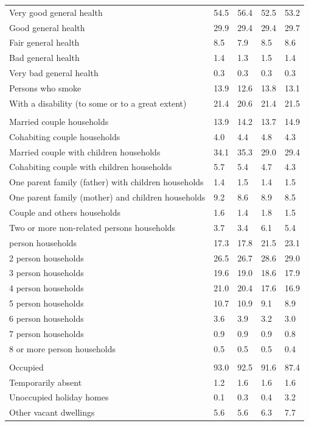 \documentclass{article}
\begin{document}
\begin{table}[h]
\begin{tabular}{KTTTT}
    \hline
Very good general health & 54.5& 56.4&52.5& 53.2\\
Good general health & 29.9& 29.4& 29.4& 29.7\\
Fair general health & 8.5& 7.9&8.5& 8.6\\
Bad general health & 1.4& 1.3&1.5& 1.4\\
Very bad general health & 0.3& 0.3&0.3& 0.3\\
    \hline
Persons who smoke & 13.9& 12.6&13.8& 13.1\\
    \hline
With a disability (to some or to a great extent) & 21.4& 20.6&21.4& 21.5\\
\hline
    \\ 
    \hline
Married couple households & 13.9& 14.2& 13.7& 14.9\\
Cohabiting couple households & 4.0& 4.4& 4.8& 4.3\\
Married couple with children households & 34.1& 35.3& 29.0& 29.4\\
Cohabiting couple with children households & 5.7& 5.4& 4.7& 4.3\\
One parent family (father) with  children households & 1.4& 1.5& 1.4& 1.5\\
One parent family (mother) and children households & 9.2& 8.6& 8.9& 8.5\\
Couple and others households  & 1.6& 1.4& 1.8& 1.5\\
Two or more non-related persons households & 3.7& 3.4& 6.1& 5.4\\
     person households & 17.3& 17.8& 21.5& 23.1\\
2 person households & 26.5& 26.7& 28.6& 29.0\\
3 person households & 19.6& 19.0& 18.6& 17.9\\
4 person households & 21.0& 20.4& 17.6& 16.9\\
5 person households & 10.7& 10.9&  9.1&  8.9\\
6 person households & 3.6& 3.9& 3.2& 3.0\\
7 person households & 0.9& 0.9& 0.9& 0.8\\
8 or more person households & 0.5& 0.5& 0.5& 0.4\\
\hline
    \\ 
    \hline
Occupied & 93.0& 92.5& 91.6& 87.4\\
Temporarily absent & 1.2& 1.6& 1.6& 1.6\\
Unoccupied holiday homes & 0.1& 0.3& 0.4& 3.2\\
Other vacant dwellings & 5.6& 5.6& 6.3& 7.7\\
\hline
\end{tabular}
\end{table}
\end{document}
